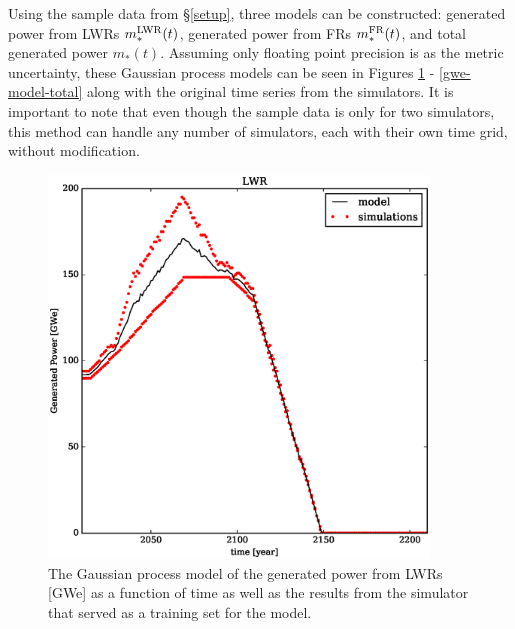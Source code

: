 Using the sample data from \S\ref{setup}, three models can be constructed:
generated power from LWRs $m_*^{\mathrm{LWR}}(t)$, generated power from FRs $m_*^{\mathrm{FR}}(t)$, 
and total generated power $m_*(t)$. Assuming only floating point precision is as 
the metric uncertainty, these Gaussian process models can be seen in Figures 
\ref{gwe-model-lwr} - \ref{gwe-model-total} along with the original time series 
from the simulators.
It is important to note that even though the sample data is only for two simulators, 
this method can handle any number of simulators, each with their own time grid, 
without modification.

\begin{figure}[htb]
\centering
\includegraphics[width=0.9\textwidth]{gwe-model-lwr.eps}
\caption{The Gaussian process model of the generated power from LWRs [GWe] 
as a function of time as well as the results from the simulator that served as a 
training set for the model.}
\label{gwe-model-lwr}
\end{figure}

